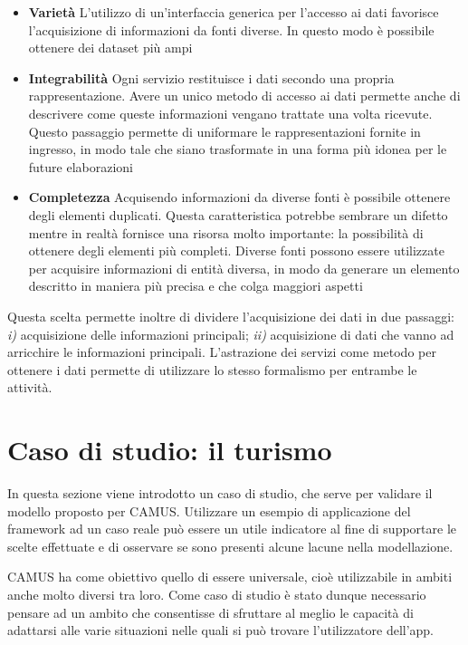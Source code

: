 \begin{itemize}
	\item \textbf{Varietà}	L'utilizzo di un'interfaccia generica per l'accesso ai dati favorisce l'acquisizione di informazioni da fonti diverse. In questo modo è possibile ottenere dei dataset più ampi
	\item \textbf{Integrabilità} Ogni servizio restituisce i dati secondo una propria rappresentazione. Avere un unico metodo di accesso ai dati permette anche di descrivere come queste informazioni vengano trattate una volta ricevute. Questo passaggio permette di uniformare le rappresentazioni fornite in ingresso, in modo tale che siano trasformate in una forma più idonea per le future elaborazioni
	\item \textbf{Completezza} Acquisendo informazioni da diverse fonti è possibile ottenere degli elementi duplicati. Questa caratteristica potrebbe sembrare un difetto mentre in realtà fornisce una risorsa molto importante: la possibilità di ottenere degli elementi più completi. Diverse fonti possono essere utilizzate per acquisire informazioni di entità diversa, in modo da generare un elemento descritto in maniera più precisa e che colga maggiori aspetti
\end{itemize}

Questa scelta permette inoltre di dividere l'acquisizione dei dati in due passaggi: \emph{i)} acquisizione delle informazioni principali; \emph{ii)} acquisizione di dati che vanno ad arricchire le informazioni principali. L'astrazione dei servizi come metodo per ottenere i dati permette di utilizzare lo stesso formalismo per entrambe le attività.

\section{Caso di studio: il turismo\label{sec:caso-studio-turismo}}

In questa sezione viene introdotto un caso di studio, che serve per validare il modello proposto per CAMUS. Utilizzare un esempio di applicazione del framework ad un caso reale può essere un utile indicatore al fine di supportare le scelte effettuate e di osservare se sono presenti alcune lacune nella modellazione.

CAMUS ha come obiettivo quello di essere universale, cioè utilizzabile in ambiti anche molto diversi tra loro. Come caso di studio è stato dunque necessario pensare ad un ambito che consentisse di sfruttare al meglio le capacità di adattarsi alle varie situazioni nelle quali si può trovare l'utilizzatore dell'app.

